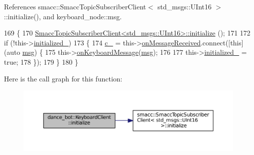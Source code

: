 References smacc\+::\+Smacc\+Topic\+Subscriber\+Client$<$ std\+\_\+msgs\+::\+U\+Int16 $>$\+::initialize(), and keyboard\+\_\+node\+::msg.


\begin{DoxyCode}
169         \{
170                 \hyperlink{classsmacc_1_1SmaccTopicSubscriberClient_af171664e207d6e86da278ea9b0d861ec}{SmaccTopicSubscriberClient<std\_msgs::UInt16>::initialize}
      ();
171 
172                 \textcolor{keywordflow}{if} (!this->\hyperlink{classdance__bot_1_1KeyboardClient_afb6a3cb23ba0c0e0b65ae7dfad216f19}{initialized\_})
173                 \{
174                         \hyperlink{classdance__bot_1_1KeyboardClient_ad2318d9d1107915d721f9457c10f1ee6}{c\_} = this->\hyperlink{classsmacc_1_1SmaccTopicSubscriberClient_a4260d955152200804e9c51a1098965c8}{onMessageReceived}.connect([\textcolor{keyword}{this}](\textcolor{keyword}{auto} 
      \hyperlink{namespacekeyboard__node_a768777e12f75b89e4a0a60acf748e9eb}{msg}) \{
175                                 this->\hyperlink{classdance__bot_1_1KeyboardClient_a17a184bb276d2de8c8ae6622db736761}{onKeyboardMessage}(\hyperlink{namespacekeyboard__node_a768777e12f75b89e4a0a60acf748e9eb}{msg});
176 
177                                 this->\hyperlink{classdance__bot_1_1KeyboardClient_afb6a3cb23ba0c0e0b65ae7dfad216f19}{initialized\_} = \textcolor{keyword}{true};
178                         \});
179                 \}
180         \}
\end{DoxyCode}


Here is the call graph for this function\+:
\nopagebreak
\begin{figure}[H]
\begin{center}
\leavevmode
\includegraphics[width=350pt]{classdance__bot_1_1KeyboardClient_aaf0de36cfc92f79e8cb036defab43afd_cgraph}
\end{center}
\end{figure}


